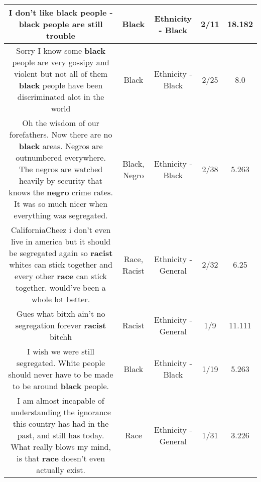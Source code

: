 \documentclass[11pt]{article}
\newlength\mylength
\begin{document}
\begin{center}
\begin{longtable}{|C{.65\mylength}|C{.30\mylength}|C{.12\mylength}|C{.12\mylength}|C{.12\mylength}|}
  \small I don't like \textbf{black} people - \textbf{black} people are still trouble\normalsize   & Black & Ethnicity - Black & 2/11 & 18.182 \\  \hline
  \small Sorry I know some \textbf{black} people are very gossipy and violent but not all of them \textbf{black} people have been discriminated alot in the world\normalsize   & Black & Ethnicity - Black & 2/25 & 8.0 \\  \hline
  \small Oh the wisdom of our forefathers.  Now there are no \textbf{black} areas.  Negros are outnumbered everywhere. The negros are watched heavily by security that knows the \textbf{negro} crime rates.  It was so much nicer when everything was segregated.\normalsize   & Black, Negro & Ethnicity - Black & 2/38 & 5.263 \\  \hline
  \small CaliforniaCheez i don't even live in america but it should be segregated again so \textbf{racist} whites can stick together and every other \textbf{race}  can stick together. would've been a whole lot better.\normalsize   & Race, Racist & Ethnicity - General & 2/32 & 6.25 \\  \hline
  \small Gues what bitxh ain't no segregation forever \textbf{racist} bitchh\normalsize   & Racist & Ethnicity - General & 1/9 & 11.111 \\  \hline
  \small I wish we were still segregated. White people should never have to be made to be around \textbf{black} people.\normalsize   & Black & Ethnicity - Black & 1/19 & 5.263 \\  \hline
  \small I am almost incapable of understanding the ignorance this country has had in the past, and still has today. What really blows my mind, is that \textbf{race} doesn't even actually exist.\normalsize   & Race & Ethnicity - General & 1/31 & 3.226 \\  \hline

\end{longtable}
\end{center}
\end{document}
